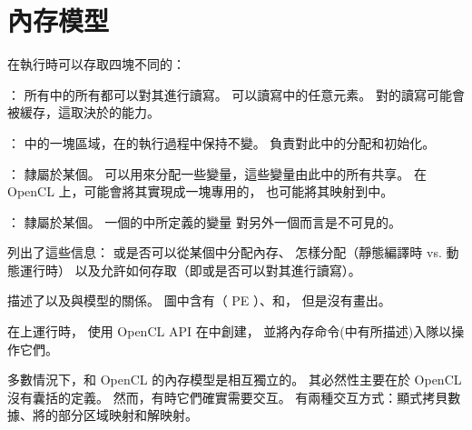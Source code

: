 
\section{內存模型}
在執行時可以存取四塊不同的：

\startigBase
\item {}：
所有中的所有都可以對其進行讀寫。
可以讀寫中的任意元素。
對的讀寫可能會被緩存，這取決於的能力。

\item {}：
中的一塊區域，在的執行過程中保持不變。
負責對此中的分配和初始化。

\item {}：
隸屬於某個。
可以用來分配一些變量，這些變量由此中的所有共享。
在 OpenCL 上，可能會將其實現成一塊專用的，
也可能將其映射到中。

\item {}：
隸屬於某個。
一個的中所定義的變量
對另外一個而言是不可見的。
\stopigBase

列出了這些信息：
或是否可以從某個中分配內存、
怎樣分配（靜態編譯時 vs. 動態運行時）
以及允許如何存取（即或是否可以對其進行讀寫）。


描述了以及與模型的關係。
圖中含有（ PE ）、和，
但是沒有畫出。

{}

在上運行時，
使用 OpenCL API 在中創建，
並將內存命令(中有所描述)入隊以操作它們。

多數情況下，和 OpenCL 的內存模型是相互獨立的。
其必然性主要在於 OpenCL 沒有囊括的定義。
然而，有時它們確實需要交互。
有兩種交互方式：顯式拷貝數據、將的部分区域映射和解映射。

